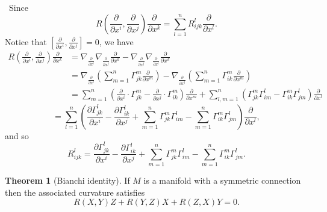 \documentclass[12pt,a4paper]{book}
\newenvironment{prooff}{{\noindent\it\textcolor{cyan!40!black}{Proof}:}\,}{\par}
\theoremstyle{definition}
\newtheorem{theo}[defn]{Theorem}
\begin{document}
\begin{prooff}
    Since
    $$
        R\left(\frac{\partial}{\partial x^i}, \frac{\partial}{\partial x^j}\right) \frac{\partial}{\partial x^k}=\sum_{l=1}^n R_{i j k}^l \frac{\partial}{\partial x^l} .
    $$
    Notice that $\left[\frac{\partial}{\partial x^i}, \frac{\partial}{\partial x^j}\right]=0$, we have
    $$
        \begin{aligned}
            R\left(\frac{\partial}{\partial x^i}, \frac{\partial}{\partial x^j}\right) \frac{\partial}{\partial x^k} & =\nabla_{\frac{\partial}{\partial x^i}} \nabla_{\frac{\partial}{\partial x^j}} \frac{\partial}{\partial x^k}-\nabla_{\frac{\partial}{\partial x^j}} \nabla_{\frac{\partial}{\partial x^i}} \frac{\partial}{\partial x^k}                                                            \\
                                                                                                                     & =\nabla_{\frac{\partial}{\partial x^i}}\left(\sum_{m=1}^n \Gamma_{j k}^m \frac{\partial}{\partial x^m}\right)-\nabla_{\frac{\partial}{\partial x^j}}\left(\sum_{m=1}^n \Gamma_{i k}^m \frac{\partial}{\partial x^m}\right)                                                          \\
                                                                                                                     & =\sum_{m=1}^n\left(\frac{\partial}{\partial x^i} \cdot \Gamma_{j k}^m-\frac{\partial}{\partial x^j} \cdot \Gamma_{i k}^m\right) \frac{\partial}{\partial x^m}+\sum_{l, m=1}^n\left(\Gamma_{j k}^m \Gamma_{i m}^l-\Gamma_{i k}^m \Gamma_{j m}^l\right) \frac{\partial}{\partial x^l}
        \end{aligned}
    $$
    $$
        =\sum_{l=1}^n\left(\frac{\partial \Gamma_{j k}^l}{\partial x^i}-\frac{\partial \Gamma_{i k}^l}{\partial x^j}+\sum_{m=1}^n \Gamma_{j k}^m \Gamma_{i m}^l-\sum_{m=1}^n \Gamma_{i k}^m \Gamma_{j m}^l\right) \frac{\partial}{\partial x^l},
    $$
    and so
    $$
        R_{i j k}^l=\frac{\partial \Gamma_{j k}^l}{\partial x^i}-\frac{\partial \Gamma_{i k}^l}{\partial x^j}+\sum_{m=1}^n \Gamma_{j k}^m \Gamma_{i m}^l-\sum_{m=1}^n \Gamma_{i k}^m \Gamma_{j m}^l .
    $$
\end{prooff}
\begin{theo}[Bianchi identity]
    If $M$ is a manifold with a symmetric connection then the associated curvature satisfies
    $$
        R(X, Y) Z+R(Y, Z) X+R(Z, X) Y=0 .
    $$
\end{theo}
\end{document}
